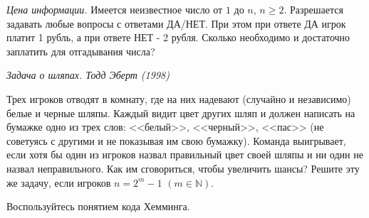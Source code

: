 \begin{comment}
\begin{definition}
\textit{Относительной энтропией} случайных величин $X \backsim P$ и $Y \backsim Q$ на множестве $A$ (или расстоянием Кульбака-Лейблера между ними) называется
\begin{center}
$KL(P||Q) = \sum_{a \in A} p_a \log \frac{p_a}{q_a}$. 
\end{center}
В статистике эта величина определяет то, насколько "неэффективно" использование распределения $Q$ для аппроксимации распределедния $P$, или как много дополнительных бит мы заплатим за такую аппроксимацию.
\end{definition}

\begin{definition}
\textit{Кодом} слова $w \in A^{len(w)}$ в алфавите $\Sigma$ называется отображение $C(w) : w \rightarrow \sigma$, $\sigma \in B^{len(\sigma)}$. $len(\sigma)$ - длина кодового слова.
\end{definition}

\subsection{Задачи}
\end{comment}
\begin{problem} \textit{Цена информации.} Имеется неизвестное число от $1$ до $n$, $n \geq 2$. Разрешается задавать любые вопросы с ответами ДА/НЕТ. При этом при ответе ДА игрок платит 1 рубль, а при ответе НЕТ - 2 рубля. Сколько необходимо и достаточно заплатить для отгадывания числа?
\end{problem}


\begin{problem}\textit{Задача о шляпах. Тодд Эберт (1998)}

Трех игроков отводят в комнату, где на них надевают (случайно и независимо) белые и черные шляпы. Каждый видит 
цвет других шляп и должен написать на бумажке одно из трех слов: <<белый>>, <<черный>>, <<пас>> 
(не советуясь с другими и не показывая им свою бумажку). Команда выигрывает, если хотя бы один из игроков назвал правильный 
цвет своей шляпы и ни один не назвал неправильного. Как им сговориться, чтобы увеличить шансы? 
Решите эту же задачу, если игроков $n=2^m -1$ $( m\in {\mathbb N} )$. 
\end{problem}

\begin{ordre}
Воспользуйтесь понятием кода Хемминга.
\end{ordre}

